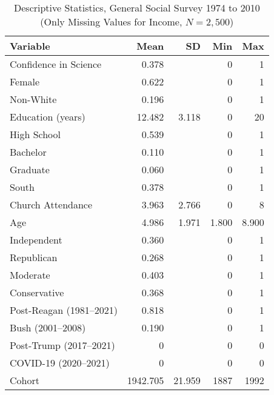 \begin{table}[ht]
\centering
\caption{Descriptive Statistics, General Social Survey 1974 to 2010 (Only Missing Values for Income, $N=2,500$)} 
\begin{tabularx}{\textwidth}{Xrrrr}
  \toprule
Variable & Mean & SD & Min & Max \\ 
  \midrule
Confidence in Science & 0.378 &  & 0 & 1 \\ 
  Female & 0.622 &  & 0 & 1 \\ 
  Non-White & 0.196 &  & 0 & 1 \\ 
  Education (years) & 12.482 & 3.118 & 0 & 20 \\ 
  High School & 0.539 &  & 0 & 1 \\ 
  Bachelor & 0.110 &  & 0 & 1 \\ 
  Graduate & 0.060 &  & 0 & 1 \\ 
  South & 0.378 &  & 0 & 1 \\ 
  Church Attendance & 3.963 & 2.766 & 0 & 8 \\ 
  Age & 4.986 & 1.971 & 1.800 & 8.900 \\ 
  Independent & 0.360 &  & 0 & 1 \\ 
  Republican & 0.268 &  & 0 & 1 \\ 
  Moderate & 0.403 &  & 0 & 1 \\ 
  Conservative & 0.368 &  & 0 & 1 \\ 
  Post-Reagan (1981--2021) & 0.818 &  & 0 & 1 \\ 
  Bush (2001--2008) & 0.190 &  & 0 & 1 \\ 
  Post-Trump (2017--2021) & 0 &  & 0 & 0 \\ 
  COVID-19 (2020--2021) & 0 &  & 0 & 0 \\ 
  Cohort & 1942.705 & 21.959 & 1887 & 1992 \\ 
   \bottomrule
\end{tabularx}
\end{table}
